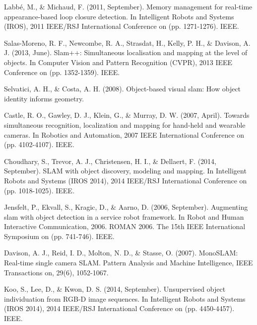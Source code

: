 \documentclass[]{article}
\begin{document}
\begin{thebibliography}{99}

            \newblock Labbé, M., \& Michaud, F. (2011, September). Memory management for real-time appearance-based loop closure detection. In Intelligent Robots and Systems (IROS), 2011 IEEE/RSJ International Conference on (pp. 1271-1276). IEEE.


            \newblock Salas-Moreno, R. F., Newcombe, R. A., Strasdat, H., Kelly, P. H., \& Davison, A. J. (2013, June). Slam++: Simultaneous localisation and mapping at the level of objects. In Computer Vision and Pattern Recognition (CVPR), 2013 IEEE Conference on (pp. 1352-1359). IEEE.

            \newblock Selvatici, A. H., \& Costa, A. H. (2008). Object-based visual slam: How object identity informs geometry.

            \newblock Castle, R. O., Gawley, D. J., Klein, G., \& Murray, D. W. (2007, April). Towards simultaneous recognition, localization and mapping for hand-held and wearable cameras. In Robotics and Automation, 2007 IEEE International Conference on (pp. 4102-4107). IEEE.


            \newblock Choudhary, S., Trevor, A. J., Christensen, H. I., \& Dellaert, F. (2014, September). SLAM with object discovery, modeling and mapping. In Intelligent Robots and Systems (IROS 2014), 2014 IEEE/RSJ International Conference on (pp. 1018-1025). IEEE.

            \newblock Jensfelt, P., Ekvall, S., Kragic, D., \& Aarno, D. (2006, September). Augmenting slam with object detection in a service robot framework. In Robot and Human Interactive Communication, 2006. ROMAN 2006. The 15th IEEE International Symposium on (pp. 741-746). IEEE.

            \newblock Davison, A. J., Reid, I. D., Molton, N. D., \& Stasse, O. (2007). MonoSLAM: Real-time single camera SLAM. Pattern Analysis and Machine Intelligence, IEEE Transactions on, 29(6), 1052-1067.

            \newblock Koo, S., Lee, D., \& Kwon, D. S. (2014, September). Unsupervised object individuation from RGB-D image sequences. In Intelligent Robots and Systems (IROS 2014), 2014 IEEE/RSJ International Conference on (pp. 4450-4457). IEEE.



\end{thebibliography}
\end{document}
